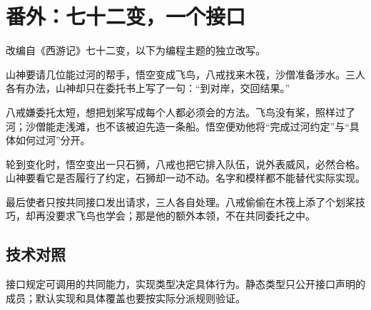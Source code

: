 \section{番外：七十二变，一个接口}

改编自《西游记》七十二变，以下为编程主题的独立改写。

山神要请几位能过河的帮手，悟空变成飞鸟，八戒找来木筏，沙僧准备涉水。三人各有办法，山神却只在委托书上写了一句：“到对岸，交回结果。”

八戒嫌委托太短，想把划桨写成每个人都必须会的方法。飞鸟没有桨，照样过了河；沙僧能走浅滩，也不该被迫先造一条船。悟空便劝他将“完成过河约定”与“具体如何过河”分开。

轮到变化时，悟空变出一只石狮，八戒也把它排入队伍，说外表威风，必然合格。山神要看它是否履行了约定，石狮却一动不动。名字和模样都不能替代实际实现。

最后使者只按共同接口发出请求，三人各自处理。八戒偷偷在木筏上添了个划桨技巧，却再没要求飞鸟也学会；那是他的额外本领，不在共同委托之中。

\subsection*{技术对照}

接口规定可调用的共同能力，实现类型决定具体行为。静态类型只公开接口声明的成员；默认实现和具体覆盖也要按实际分派规则验证。
